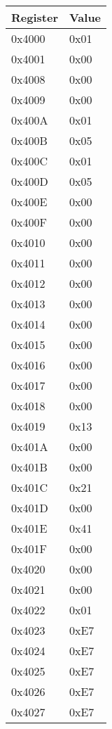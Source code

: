\begin{tabular}{ll}
Register & Value \\
\hline
\hline
0x4000 & 0x01 \\
0x4001 & 0x00 \\
0x4008 & 0x00 \\
0x4009 & 0x00 \\
0x400A & 0x01 \\
0x400B & 0x05 \\
0x400C & 0x01 \\
0x400D & 0x05 \\
0x400E & 0x00 \\
0x400F & 0x00 \\
0x4010 & 0x00 \\
0x4011 & 0x00 \\
0x4012 & 0x00 \\
0x4013 & 0x00 \\
0x4014 & 0x00 \\
0x4015 & 0x00 \\
0x4016 & 0x00 \\
0x4017 & 0x00 \\
0x4018 & 0x00 \\
0x4019 & 0x13 \\
0x401A & 0x00 \\
0x401B & 0x00 \\
0x401C & 0x21 \\
0x401D & 0x00 \\
0x401E & 0x41 \\
0x401F & 0x00 \\
0x4020 & 0x00 \\
0x4021 & 0x00 \\
0x4022 & 0x01 \\
0x4023 & 0xE7 \\
0x4024 & 0xE7 \\
0x4025 & 0xE7 \\
0x4026 & 0xE7 \\
0x4027 & 0xE7 \\
\hline
\end{tabular}

\quad

